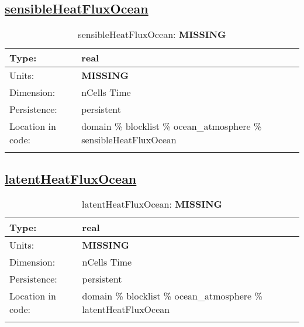 \subsection[sensibleHeatFluxOcean]{\hyperref[sec:var_tab_ocean_atmosphere]{sensibleHeatFluxOcean}}
\label{subsec:var_sec_ocean_atmosphere_sensibleHeatFluxOcean}
\begin{center}
\begin{longtable}{| p{2.0in} | p{4.0in} |}
        \hline 
        Type: & real \\
        \hline 
        Units: & {\bf \color{red} MISSING} \\
        \hline 
        Dimension: & nCells Time \\
        \hline 
        Persistence: & persistent \\
        \hline 
         Location in code: & domain \% blocklist \% ocean\_atmosphere \% sensibleHeatFluxOcean \\
         \hline 
    \caption{sensibleHeatFluxOcean: {\bf \color{red} MISSING}}
\end{longtable}
\end{center}
\subsection[latentHeatFluxOcean]{\hyperref[sec:var_tab_ocean_atmosphere]{latentHeatFluxOcean}}
\label{subsec:var_sec_ocean_atmosphere_latentHeatFluxOcean}
\begin{center}
\begin{longtable}{| p{2.0in} | p{4.0in} |}
        \hline 
        Type: & real \\
        \hline 
        Units: & {\bf \color{red} MISSING} \\
        \hline 
        Dimension: & nCells Time \\
        \hline 
        Persistence: & persistent \\
        \hline 
         Location in code: & domain \% blocklist \% ocean\_atmosphere \% latentHeatFluxOcean \\
         \hline 
    \caption{latentHeatFluxOcean: {\bf \color{red} MISSING}}
\end{longtable}
\end{center}
